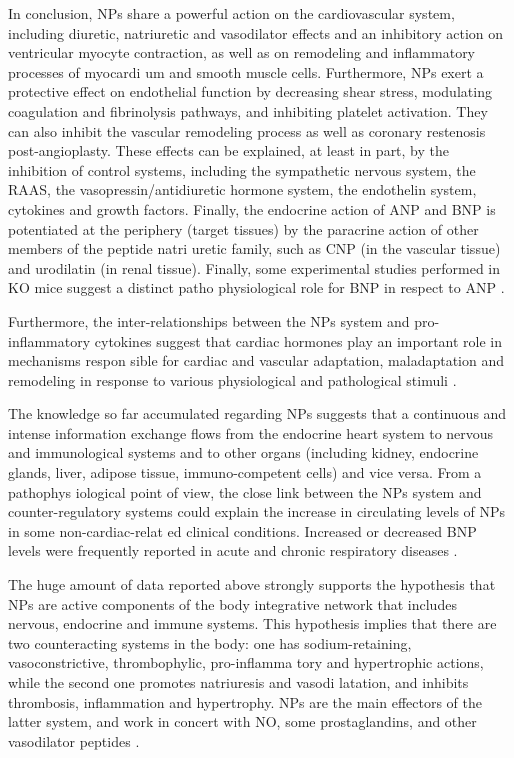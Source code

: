 \documentclass[14pt,a4paper,onecolumn]{extarticle}
\begin{document}
In conclusion, NPs share a powerful action on the cardiovascular system, including diuretic, natriuretic and vasodilator effects and an inhibitory action on ventricular myocyte contraction, as well as on remodeling and inflammatory processes of myocardi um and smooth muscle cells. Furthermore, NPs exert a protective effect on endothelial function by decreasing shear stress, modulating coagulation and fibrinolysis pathways, and inhibiting platelet activation. They can also inhibit the vascular remodeling process as well as coronary restenosis post-angioplasty. These effects can be explained, at least in part, by the inhibition of control systems, including the sympathetic nervous system, the RAAS, the vasopressin/antidiuretic hormone system, the endothelin system, cytokines and growth factors. Finally, the endocrine action of ANP and BNP is potentiated at the periphery (target tissues) by the paracrine action of other members of the peptide natri uretic family, such as CNP (in the vascular tissue) and urodilatin (in renal tissue).  Finally, some experimental studies performed in KO mice suggest a distinct patho physiological role for BNP in respect to ANP \citep{18}. %

Furthermore, the inter-relationships between the NPs system and pro-inflammatory cytokines suggest that cardiac hormones play an important role in mechanisms respon sible for cardiac and vascular adaptation, maladaptation and remodeling in response to various physiological and pathological stimuli \citep{32} \citep{35}.   %

The knowledge so far accumulated regarding NPs suggests that a continuous and intense information exchange flows from the endocrine heart system to nervous and immunological systems and to other organs (including kidney, endocrine glands, liver, adipose tissue, immuno-competent cells) and vice versa. From a pathophys iological point of view, the close link between the NPs system and counter-regulatory systems could explain the increase in circulating levels of NPs in some non-cardiac-relat ed clinical conditions. Increased or decreased BNP levels were frequently reported in acute and chronic respiratory diseases \citep{121} \citep{122} \citep{123} \citep{bib382} \citep{126} \citep{bib383} \citep{128} \citep{129}. %

The huge amount of data reported above strongly supports the hypothesis that NPs are active components of the body integrative network that includes nervous, endocrine and immune systems. This hypothesis implies that there are two counteracting systems in the body: one has sodium-retaining, vasoconstrictive, thrombophylic, pro-inflamma tory and hypertrophic actions, while the second one promotes natriuresis and vasodi latation, and inhibits thrombosis, inflammation and hypertrophy. NPs are the main effectors of the latter system, and work in concert with NO, some prostaglandins, and other vasodilator peptides \citep{119} \citep{120}. %
\end{document}
